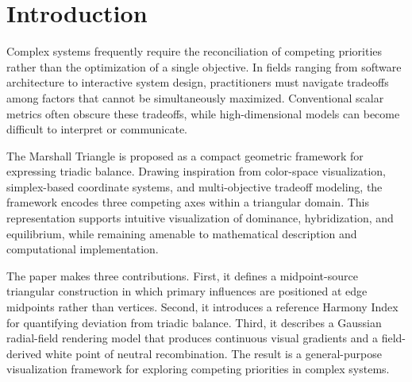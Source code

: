 \documentclass[preprints,article,submit,pdftex,oneauthor]{Definitions/mdpi}
\begin{document}

\fi
\section{Introduction}

Complex systems frequently require the reconciliation of competing priorities rather than the optimization of a single objective. In fields ranging from software architecture to interactive system design, practitioners must navigate tradeoffs among factors that cannot be simultaneously maximized. Conventional scalar metrics often obscure these tradeoffs, while high-dimensional models can become difficult to interpret or communicate.

The Marshall Triangle is proposed as a compact geometric framework for expressing triadic balance. Drawing inspiration from color-space visualization, simplex-based coordinate systems, and multi-objective tradeoff modeling, the framework encodes three competing axes within a triangular domain. This representation supports intuitive visualization of dominance, hybridization, and equilibrium, while remaining amenable to mathematical description and computational implementation.

The paper makes three contributions. First, it defines a midpoint-source triangular construction in which primary influences are positioned at edge midpoints rather than vertices. Second, it introduces a reference Harmony Index for quantifying deviation from triadic balance. Third, it describes a Gaussian radial-field rendering model that produces continuous visual gradients and a field-derived white point of neutral recombination. The result is a general-purpose visualization framework for exploring competing priorities in complex systems.
\end{document}
